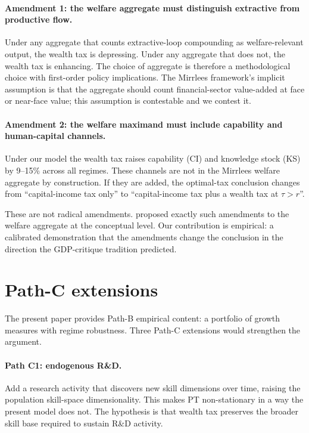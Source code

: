 \documentclass[11pt]{article}
\begin{document}
\paragraph{Amendment 1: the welfare aggregate must distinguish
extractive from productive flow.}  Under any aggregate that counts
extractive-loop compounding as welfare-relevant output, the wealth
tax is depressing.  Under any aggregate that does not, the wealth
tax is enhancing.  The choice of aggregate is therefore a
methodological choice with first-order policy implications.  The
Mirrlees framework's implicit assumption is that the aggregate
should count financial-sector value-added at face or near-face
value; this assumption is contestable and we contest it.

\paragraph{Amendment 2: the welfare maximand must include
capability and human-capital channels.}  Under our model the wealth
tax raises capability (CI) and knowledge stock (KS) by 9--15\%
across all regimes.  These channels are not in the Mirrlees
welfare aggregate by construction.  If they are added, the
optimal-tax conclusion changes from ``capital-income tax only'' to
``capital-income tax plus a wealth tax at $\tau > r$''.

These are not radical amendments.  \citet{stiglitz2009commission}
proposed exactly such amendments to the welfare aggregate at the
conceptual level.  Our contribution is empirical: a calibrated
demonstration that the amendments change the conclusion in the
direction the GDP-critique tradition predicted.

\section{Path-C extensions}
\label{sec:pathC}

The present paper provides Path-B empirical content: a portfolio of
growth measures with regime robustness.  Three Path-C extensions
would strengthen the argument.

\paragraph{Path C1: endogenous R\&D.}  Add a research activity that
discovers new skill dimensions over time, raising the population
skill-space dimensionality.  This makes PT non-stationary in a way
the present model does not.  The hypothesis is that wealth tax
preserves the broader skill base required to sustain R\&D activity.
\end{document}
